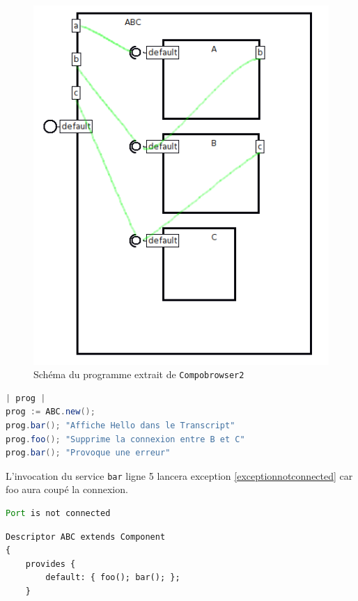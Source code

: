 \documentclass[11pt,a4paper,openany,oneside]{book}
\begin{document}
\begin{appendices}
\begin{figure}[H]
\centering
\includegraphics[scale=0.55, keepaspectratio=true]{abc}
\caption{Schéma du programme extrait de \texttt{Compobrowser2}}
\label{abc}
\end{figure}

\begin{lstlisting}[language=Java, frame=single, caption=Workspace]
| prog |
prog := ABC.new();
prog.bar(); "Affiche Hello dans le Transcript"
prog.foo(); "Supprime la connexion entre B et C"
prog.bar(); "Provoque une erreur" 
\end{lstlisting}

L'invocation du service \texttt{bar} ligne 5 lancera exception \ref{exceptionnotconnected} car foo aura coupé la connexion.


\begin{lstlisting}[language=Java, frame=single, caption=Erreur lors de l'éxécution du 2e bar(),label=exceptionnotconnected]
Port is not connected
\end{lstlisting}




\begin{lstlisting}[language=Compo, frame=single, caption=Exemple d'une deconnexion à distance]
Descriptor ABC extends Component
{
	provides {
		default: { foo(); bar(); };
	}
	

\end{lstlisting}
\end{appendices}
\end{document}
